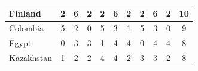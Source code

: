 \documentclass[12pt]{article}  %
\begin{document}
\begin{subappendices}
\begin{longtable}{|l|c|c|c|c|c|c|c|c|c|c|}
	\hline
	Finland                                                        & 2                                                                      & 6                                                                      & 2                                                                      & 2                                                                      & 6                                                                      & 2                                                                      & 2                         & 6                           & 2                           & 10                          \\ 
	\hline
	Colombia                                                       & 5                                                                      & 2                                                                      & 0                                                                      & 5                                                                      & 3                                                                      & 1                                                                      & 5                         & 3                           & 0                           & 9                           \\ 
	\hline
	Egypt                                                          & 0                                                                      & 3                                                                      & 3                                                                      & 1                                                                      & 4                                                                      & 4                                                                      & 0                         & 4                           & 4                           & 8                           \\ 
	\hline
	Kazakhstan                                                     & 1                                                                      & 2                                                                      & 2                                                                      & 4                                                                      & 4                                                                      & 2                                                                      & 3                         & 3                           & 2                           & 8                           \\ 

\end{longtable}
\end{subappendices}
\end{document}
